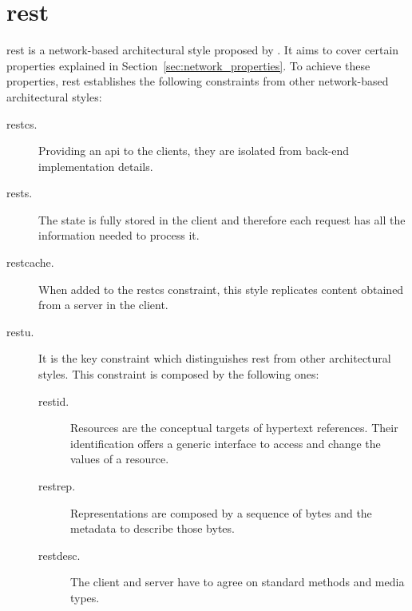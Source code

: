 \section{\acl{rest}}
\label{sec:rest}

\acf{rest} is a network-based architectural style proposed by \citet{fielding_architectural_2000}.
It aims to cover certain properties explained in Section~\ref{sec:network_properties}. %
To achieve these properties, \ac{rest} establishes the following constraints from other network-based architectural styles:
\begin{description}
 \item[\acf{restcs}.] Providing an \ac{api} to the clients, they are isolated from back-end implementation details.
 \item[\acf{rests}.] The state is fully stored in the client and therefore each request has all the information needed to process it.
 \item[\acf{restcache}.] When added to the \ac{restcs} constraint, this style replicates content obtained from a server in the client.
 \item[\acf{restu}.] It is the key constraint which distinguishes \ac{rest} from other architectural styles.
                      This constraint is composed by the following ones:
    \begin{description}
	\item[\acf{restid}.] Resources are the conceptual targets of hypertext references.
			      Their identification offers a generic interface to access and change the values of a resource.
	\item[\acf{restrep}.] Representations are composed by a sequence of bytes and the metadata to describe those bytes.
	\item[\acf{restdesc}.] The client and server have to agree on standard methods and media types. %

\end{description}
\end{description}

